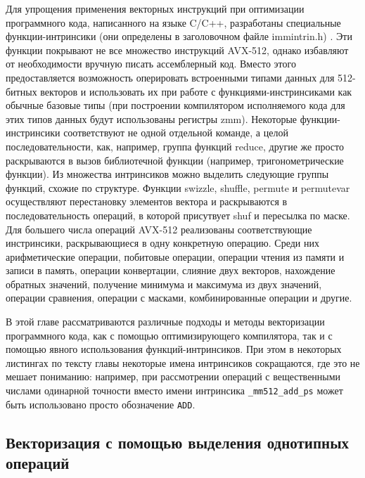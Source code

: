 Для упрощения применения векторных инструкций при оптимизации программного кода, написанного на языке C/C++, разработаны специальные функции-интринсики (они определены в заголовочном файле immintrin.h) \cite{IntelIntrinsicsGuide}.
Эти функции покрывают не все множество инструкций AVX-512, однако избавляют от необходимости вручную писать ассемблерный код.
Вместо этого предоставляется возможность оперировать встроенными типами данных для 512-битных векторов и использовать их при работе с функциями-инстринсиками как обычные базовые типы (при построении компилятором исполняемого кода для этих типов данных будут использованы регистры zmm).
Некоторые функции-инстринсики соответствуют не одной отдельной команде, а целой последовательности, как, например, группа функций reduce, другие же просто раскрываются в вызов библиотечной функции (например, тригонометрические функции).
Из множества интринсиков можно выделить следующие группы функций, схожие по структуре.
Функции swizzle, shuffle, permute и permutevar осуществляют перестановку элементов вектора и раскрываются в последовательность операций, в которой присутвует shuf и пересылка по маске.
Для большего числа операций AVX-512 реализованы соответствующие инстринсики, раскрывающиеся в одну конкретную операцию.
Среди них арифметические операции, побитовые операции, операции чтения из памяти и записи в память, операции конвертации, слияние двух векторов, нахождение обратных значений, получение минимума и максимума из двух значений, операции сравнения, операции с масками, комбинированные операции и другие.

В этой главе рассматриваются различные подходы и методы векторизации программного кода, как с помощью оптимизирующего компилятора, так и с помощью явного использования функций-интринсиков.
При этом в некоторых листингах по тексту главы некоторые имена интринсиков сокращаются, где это не мешает пониманию: например, при рассмотрении операций с вещественными числами одинарной точности вместо имени интринсика \texttt{\_mm512\_add\_ps} может быть использовано просто обозначение \texttt{ADD}.


\subsection{Векторизация с помощью выделения однотипных \mbox{операций}}\label{sec:text_4_small_matr}

